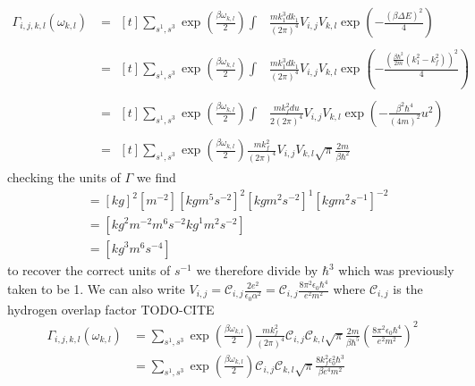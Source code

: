 \begin{align}
    \Gamma_{i,j, k,l}(\omega_{k,l}) & =\begin{aligned}[t]
        \sum_{s^1,s^3} \exp{(\frac{\beta \omega_{k,l}}{2})} \int &
        \frac{m k_1^3 dk_1}{{(2\pi)}^4}
        V_{i,j} V_{k,l} \exp{(- \frac{{(\beta \Delta E)}^2}{4})}
    \end{aligned} \\
                                    & =\begin{aligned}[t]
        \sum_{s^1,s^3} \exp{(\frac{\beta \omega_{k,l}}{2})} \int &
        \frac{m k_1^3 dk_1}{{(2\pi)}^4}
        V_{i,j} V_{k,l} \exp{(- \frac{{(\frac{\beta \hbar^2}{2 m}(k_1^2 - k_f^2))}^2}{4})}
    \end{aligned} \\
                                    & =\begin{aligned}[t]
        \sum_{s^1,s^3} \exp{(\frac{\beta \omega_{k,l}}{2})} \int &
        \frac{m k_f^2 du}{2{(2\pi)}^4}
        V_{i,j} V_{k,l} \exp{(- \frac{\beta^2 \hbar^4}{{(4m)}^2} u^2)}
    \end{aligned} \\
                                    & =\begin{aligned}[t]
        \sum_{s^1,s^3} \exp{(\frac{\beta \omega_{k,l}}{2})} \frac{m k_f^2 }{{(2\pi)}^4}
        V_{i,j} V_{k,l} \sqrt{\pi} \frac{2m}{\beta \hbar^2}
    \end{aligned}
\end{align}
checking the units of \(\Gamma \) we find
\begin{align}
    [\Gamma] & = {[kg]}^2[m^{-2}]{[kgm^5s^{-2}]}^2{[kgm^2s^{-2}]}^{1}{[kg m^2 s^{-1}]}^{-2} \\
             & = [{kg}^2 m^{-2} m^{6} s^{-2} {kg}^{1} m^{2} s^{-2}]                         \\
             & = [{kg}^3 m^{6}s^{-4}]
\end{align}
to recover the correct units of \(s^{-1}\) we
therefore divide by \(\hbar^3 \) which was previously
taken to be 1. We can also write
\(V_{i,j}
= \mathcal{C}_{i,j} \frac{2e^2}{\epsilon_0 \alpha^2}
= \mathcal{C}_{i,j} \frac{8 \pi^2 \epsilon_0 \hbar^4}{e^2 m^2}\)
where \(\mathcal{C}_{i,j}\) is the hydrogen
overlap factor TODO-CITE
\begin{align}
    \Gamma_{i,j, k,l}(\omega_{k,l}) & =
    \sum_{s^1,s^3} \exp{(\frac{\beta \omega_{k,l}}{2})}
    \frac{m k_f^2 }{{(2\pi)}^4}
    \mathcal{C}_{i,j} \mathcal{C}_{k,l}
    \sqrt{\pi} \frac{2m}{\beta \hbar^5} {(\frac{8 \pi^2 \epsilon_0 \hbar^4}{e^2 m^2})}^2 \\
                                    & =
    \sum_{s^1,s^3} \exp{(\frac{\beta \omega_{k,l}}{2})}
    \mathcal{C}_{i,j} \mathcal{C}_{k,l}
    \sqrt{\pi} \frac{8 k_f^2 \epsilon_0^2 \hbar^3}{\beta e^4 m^2}
\end{align}

